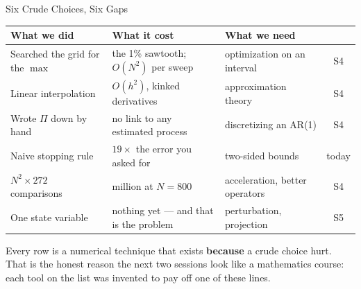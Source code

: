 \begin{frame}{Six Crude Choices, Six Gaps}
\renewcommand{\arraystretch}{1.15}
\begin{center}\footnotesize
\begin{tabularx}{\linewidth}{@{}>{\raggedright\arraybackslash}p{2.7cm} >{\raggedright\arraybackslash}X >{\raggedright\arraybackslash}p{3.2cm} c@{}}
\toprule
\textbf{What we did} & \textbf{What it cost} & \textbf{What we need} & \\
\midrule
Searched the grid for the $\max$ & the 1\% sawtooth; $O(N^2)$ per sweep & optimization on an interval & S4 \\
Linear interpolation & $O(h^2)$, kinked derivatives & approximation theory & S4 \\
Wrote $\Pi$ down by hand & no link to any estimated process & discretizing an AR(1) & S4 \\
Naive stopping rule & $19\times$ the error you asked for & two-sided bounds & today \\
$N^2\times272$ comparisons & 174 million at $N=800$ & acceleration, better operators & S4 \\
One state variable & nothing yet --- and that is the problem & perturbation, projection & S5 \\
\bottomrule
\end{tabularx}
\end{center}
\vspace{1mm}
\begin{takeawaybox}\small
Every row is a numerical technique that exists \textbf{because} a crude choice hurt. That is the honest reason the next two sessions look like a mathematics course: each tool on the list was invented to pay off one of these lines.
\end{takeawaybox}
\end{frame}

